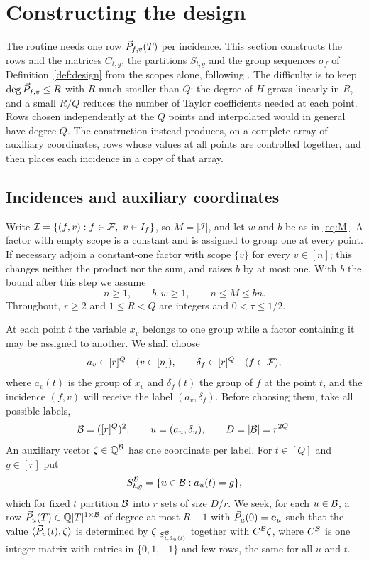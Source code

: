 \section{Constructing the design}\label{sec:design}

The routine needs one row $\vec{P}_{f,v}(T)$ per incidence. This section constructs
the rows and the matrices $C_{t,g}$, the partitions $S_{t,g}$ and the group
sequences $\sigma_f$ of Definition~\ref{def:design} from the scopes alone,
following \cite[Section 4]{OAI26}. The difficulty is to keep
$\deg\vec{P}_{f,v}\le R$ with $R$ much smaller than $Q$: the degree of $H$ grows
linearly in $R$, and a small $R/Q$ reduces the number of Taylor coefficients
needed at each point. Rows chosen independently at the $Q$ points and
interpolated would in general have degree $Q$. The construction instead
produces, on a complete array of auxiliary coordinates, rows whose values at all
points are controlled together, and then places each incidence in a copy of that
array.

\subsection{Incidences and auxiliary coordinates}
Write $\mathcal I=\{(f,v):f\in\mathcal{F},\ v\in I_f\}$, so $M=|\mathcal I|$, and let
$w$ and $b$ be as in \eqref{eq:M}. A factor with empty scope is a constant and is
assigned to group one at every point. If necessary adjoin a constant-one factor
with scope $\{v\}$ for every $v\in[n]$; this changes neither the product nor the
sum, and raises $b$ by at most one. With $b$ the bound after this step we assume
\begin{equation}\label{eq:nMb}
  n\ge1,\qquad b,w\ge1,\qquad n\le M\le bn .
\end{equation}
Throughout, $r\ge2$ and $1\le R<Q$ are integers and $0<\tau\le1/2$.

At each point $t$ the variable $x_v$ belongs to one group while a factor
containing it may be assigned to another. We shall choose
\[
  a_v\in[r]^{Q}\quad(v\in[n]),\qquad \delta_f\in[r]^{Q}\quad(f\in\mathcal{F}),
\]
where $a_v(t)$ is the group of $x_v$ and $\delta_f(t)$ the group of $f$ at the
point $t$, and the incidence $(f,v)$ will receive the label $(a_v,\delta_f)$.
Before choosing them, take all possible labels,
\begin{equation}\label{eq:B}
  \mathcal{B}=([r]^{Q})^2,\qquad u=(a_u,\delta_u),\qquad D=|\mathcal{B}|=r^{2Q}.
\end{equation}
An auxiliary vector $\zeta\in\mathbb{Q}^{\mathcal{B}}$ has one coordinate per label. For $t\in[Q]$
and $g\in[r]$ put
\begin{equation}\label{eq:SB}
  S^{\mathcal{B}}_{t,g}=\{u\in\mathcal{B}:a_u(t)=g\},
\end{equation}
which for fixed $t$ partition $\mathcal{B}$ into $r$ sets of size $D/r$. We seek, for each
$u\in\mathcal{B}$, a row $\vec{P}_u(T)\in\mathbb{Q}[T]^{1\times\mathcal{B}}$ of degree at most $R-1$ with
$\vec{P}_u(0)=\mathbf{e}_u$ such that the value $\langle \vec{P}_u(t),\zeta\rangle$ is determined by
$\zeta|_{S^{\mathcal{B}}_{t,\delta_u(t)}}$ together with $C^{\mathcal{B}}\zeta$, where $C^{\mathcal{B}}$ is one
integer matrix with entries in $\{0,1,-1\}$ and few rows, the same for all $u$ and
$t$.

